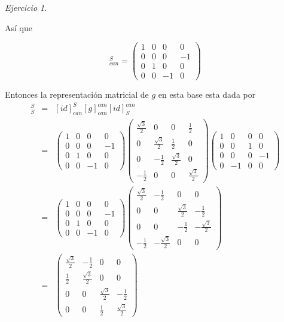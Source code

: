 \documentclass[11pt,a4paper]{article}
\theoremstyle{definition}
\theoremstyle{remark}
\newtheorem{exc}{Ejercicio}
\begin{document}
\begin{exc}
\begin{enumerate}
		Así que  
		
		\begin{equation}
		[id]_{can}^S=\begin{pmatrix}
		1 & 0 & 0 & 0
		\\ 0 & 0 & 0 & -1
		\\ 0 & 1 & 0 & 0  
		\\ 0 & 0 & -1 & 0
		\end{pmatrix} \nonumber
		\end{equation}
		
		Entonces la representación matricial de $ g $ en esta base esta dada por
		\begin{eqnarray}
		[g]_S^S & = & [id]_{can}^S[g]_{can}^{can}[id]_S^{can}\nonumber
		\\ & = & 
		\begin{pmatrix}
		1 & 0 & 0 & 0
		\\ 0 & 0 & 0 & -1
		\\ 0 & 1 & 0 & 0  
		\\ 0 & 0 & -1 & 0
		\end{pmatrix}
		\begin{pmatrix}
		\frac{\sqrt{3}}{2} & 0 & 0 & \frac{1}{2}
		\\ 0 & \frac{\sqrt{3}}{2} & \frac{1}{2} & 0 
		\\ 0 & -\frac{1}{2} & \frac{\sqrt{3}}{2} & 0
		\\ -\frac{1}{2} & 0 & 0 & \frac{\sqrt{3}}{2}
		\end{pmatrix} 
		\begin{pmatrix}
		1 & 0 & 0 & 0
		\\ 0 & 0 & 1 & 0  
		\\ 0 & 0 & 0 & -1
		\\ 0 & -1 & 0 & 0
		\end{pmatrix} \nonumber
		\\ & = &
		\begin{pmatrix}
		1 & 0 & 0 & 0
		\\ 0 & 0 & 0 & -1
		\\ 0 & 1 & 0 & 0  
		\\ 0 & 0 & -1 & 0
		\end{pmatrix}
		\begin{pmatrix}
		\frac{\sqrt{3}}{2} & -\frac{1}{2} & 0 & 0
		\\ 0 & 0 & \frac{\sqrt{3}}{2} & -\frac{1}{2}  
		\\ 0 & 0 & -\frac{1}{2} & -\frac{\sqrt{3}}{2}
		\\ -\frac{1}{2} & -\frac{\sqrt{3}}{2} & 0 & 0
		\end{pmatrix} \nonumber
		\\ & = & 
		\begin{pmatrix}
		\frac{\sqrt{3}}{2} & -\frac{1}{2} & 0 & 0
		\\ \frac{1}{2} & \frac{\sqrt{3}}{2} & 0 & 0
		\\ 0 & 0 & \frac{\sqrt{3}}{2} & -\frac{1}{2}  
		\\ 0 & 0 & \frac{1}{2} & \frac{\sqrt{3}}{2}
		\end{pmatrix} \nonumber
		\end{eqnarray}
		

\end{enumerate}
\end{exc}
\end{document}
